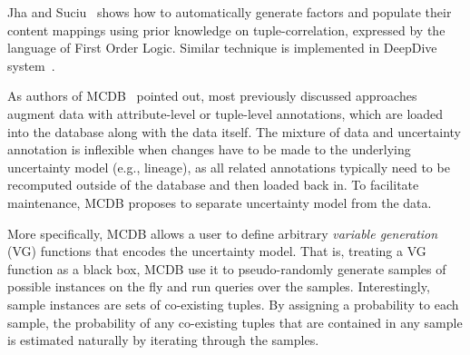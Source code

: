 Jha and Suciu~\cite{jha2012probabilistic} shows how to automatically generate factors and populate their content mappings using prior knowledge on tuple-correlation, expressed by the language of First Order Logic.
Similar technique is implemented in DeepDive system~\cite{shin2015incremental}.

As authors of MCDB~\cite{jampani2008mcdb} pointed out, most previously discussed approaches augment data with attribute-level or tuple-level annotations, which are loaded into the database along with the data itself.
The mixture of data and uncertainty annotation is inflexible when changes have to be made to the underlying uncertainty model (e.g., lineage), as all related annotations typically need to be recomputed outside of the database and then loaded back in.
To facilitate maintenance, MCDB proposes to separate uncertainty model from the data.

More specifically, MCDB allows a user to define arbitrary \emph{variable generation} (VG) functions that encodes the uncertainty model.
That is, treating a VG function as a black box, MCDB use it to pseudo-randomly generate samples of possible instances on the fly and run queries over the samples.
Interestingly, sample instances are sets of co-existing tuples.
By assigning a probability to each sample, the probability of any co-existing tuples that are contained in any sample is estimated naturally by iterating through the samples. 

